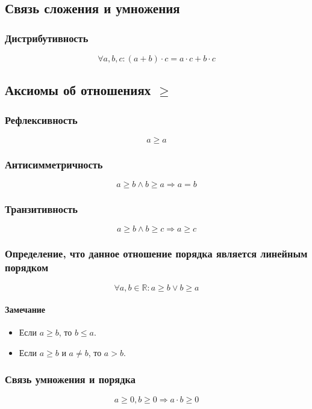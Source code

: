 \documentclass{article}
\begin{document}
\subsection{Связь сложения и умножения}

\subsubsection{Дистрибутивность}
\[
    \forall a, b, c: (a + b) \cdot c = a \cdot c + b \cdot c
\]


\subsection{Аксиомы об отношениях $\ge$}

\subsubsection{Рефлексивность}
\[
    a \ge a
\]

\subsubsection{Антисимметричность}
\[
    a \ge b \wedge b \ge a \Rightarrow a = b
\]

\subsubsection{Транзитивность}
\[
    a \ge b \wedge b \ge c \Rightarrow a \ge c
\]

\subsubsection{Определение, что данное отношение порядка является линейным порядком}
\[
    \forall a, b \in \mathbb{R}: a \ge b \vee b \ge a
\]

\paragraph{Замечание}
\begin{itemize}
    \item Если $a \ge b$, то $b \le a$.
    \item Если $a \ge b$ и $a \neq b$, то $a > b$.
\end{itemize}

\subsubsection{Связь умножения и порядка}
\[
    a \ge 0, b \ge 0 \Rightarrow a \cdot b \ge 0
\]
\end{document}
